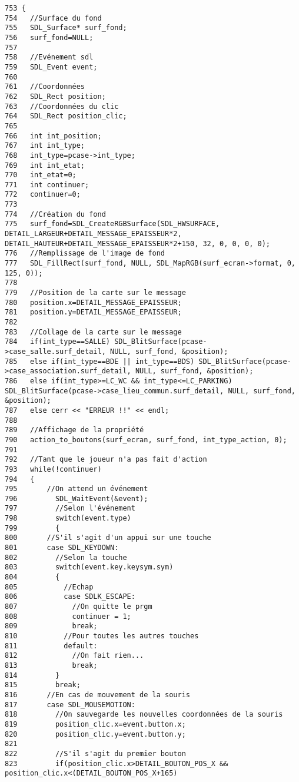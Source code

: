 \begin{Code}\begin{verbatim}753 {
754   //Surface du fond
755   SDL_Surface* surf_fond;
756   surf_fond=NULL;
757 
758   //Evénement sdl
759   SDL_Event event;
760   
761   //Coordonnées
762   SDL_Rect position;
763   //Coordonnées du clic
764   SDL_Rect position_clic;
765   
766   int int_position;
767   int int_type;
768   int_type=pcase->int_type;
769   int int_etat;
770   int_etat=0;
771   int continuer;
772   continuer=0;
773   
774   //Création du fond
775   surf_fond=SDL_CreateRGBSurface(SDL_HWSURFACE, DETAIL_LARGEUR+DETAIL_MESSAGE_EPAISSEUR*2, DETAIL_HAUTEUR+DETAIL_MESSAGE_EPAISSEUR*2+150, 32, 0, 0, 0, 0);
776   //Remplissage de l'image de fond
777   SDL_FillRect(surf_fond, NULL, SDL_MapRGB(surf_ecran->format, 0, 125, 0));
778   
779   //Position de la carte sur le message
780   position.x=DETAIL_MESSAGE_EPAISSEUR;
781   position.y=DETAIL_MESSAGE_EPAISSEUR;
782   
783   //Collage de la carte sur le message 
784   if(int_type==SALLE) SDL_BlitSurface(pcase->case_salle.surf_detail, NULL, surf_fond, &position);
785   else if(int_type==BDE || int_type==BDS) SDL_BlitSurface(pcase->case_association.surf_detail, NULL, surf_fond, &position);
786   else if(int_type>=LC_WC && int_type<=LC_PARKING) SDL_BlitSurface(pcase->case_lieu_commun.surf_detail, NULL, surf_fond, &position);
787   else cerr << "ERREUR !!" << endl;
788   
789   //Affichage de la propriété
790   action_to_boutons(surf_ecran, surf_fond, int_type_action, 0);
791   
792   //Tant que le joueur n'a pas fait d'action
793   while(!continuer)
794   {
795       //On attend un événement
796         SDL_WaitEvent(&event);
797         //Selon l'événement
798         switch(event.type)
799         {
800       //S'il s'agit d'un appui sur une touche
801       case SDL_KEYDOWN:
802         //Selon la touche
803         switch(event.key.keysym.sym)
804         {
805           //Echap
806           case SDLK_ESCAPE:
807             //On quitte le prgm
808             continuer = 1;
809             break;
810           //Pour toutes les autres touches
811           default:
812             //On fait rien...
813             break;
814         }
815         break;
816       //En cas de mouvement de la souris
817       case SDL_MOUSEMOTION:
818         //On sauvegarde les nouvelles coordonnées de la souris
819         position_clic.x=event.button.x;
820         position_clic.y=event.button.y;
821         
822         //S'il s'agit du premier bouton
823         if(position_clic.x>DETAIL_BOUTON_POS_X && position_clic.x<(DETAIL_BOUTON_POS_X+165)

\end{verbatim}
\end{Code}
